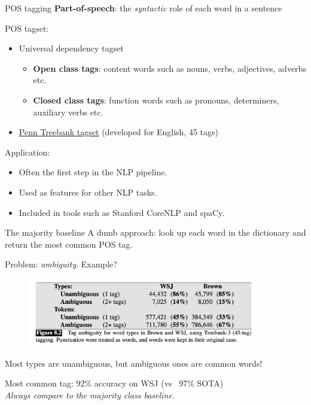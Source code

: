 \documentclass[usenames,dvipsnames,notes]{beamer}
\begin{document}
\begin{frame}
    {POS tagging}
    \textbf{Part-of-speech}: the \emph{syntactic} role of each word in a sentence

    POS tagset:\\
    \begin{itemize}
        \item Universal dependency tagset
            \begin{itemize}
                \item \textbf{Open class tags}: content words such as nouns, verbs, adjectives, adverbs etc.
                \item \textbf{Closed class tags}: function words such as pronouns, determiners, auxiliary verbs etc. 
            \end{itemize}
        \item \href{https://www.ling.upenn.edu/courses/Fall_2003/ling001/penn_treebank_pos.html}{Penn Treebank tagset} (developed for English, 45 tags)
    \end{itemize}

    Application:\\
    \begin{itemize}
        \item Often the first step in the NLP pipeline.
        \item Used as features for other NLP tasks.
        \item Included in tools such as Stanford CoreNLP and spaCy.
    \end{itemize}
\end{frame}

\begin{frame}
    {The majority baseline}
    A dumb approach: look up each word in the dictionary and return the most common POS tag.

    \pause
    Problem: \emph{ambiguity}. Example?

    \begin{figure}
        \includegraphics[height=3cm]{figures/pos-ambiguity}
    \end{figure}
    \vspace{-2em}
    Most types are unambiguous, but ambiguous ones are common words!

    Most common tag: 92\% accuracy on WSJ (vs ~97\% SOTA)\\
    \emph{Always compare to the majority class baseline.}

\end{frame}
\end{document}
